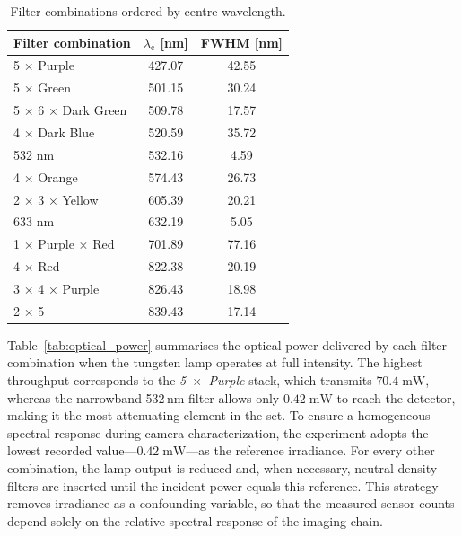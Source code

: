 \begin{table}[H]
    \centering
    \caption{Filter combinations ordered by centre wavelength.}
    \label{tab:cwl_fwhm_sorted}
    \begin{tabular}{|l|c|c|}
        \hline
        \rowcolor[HTML]{EFEFEF}
        \textbf{Filter combination} & \(\lambda_{\mathrm{c}}\) [nm] & FWHM [nm] \\ \hline
        5 × Purple                  & 427.07 & 42.55 \\ \hline
        5 × Green                   & 501.15 & 30.24 \\ \hline
        5 × 6 × Dark Green          & 509.78 & 17.57 \\ \hline
        4 × Dark Blue               & 520.59 & 35.72 \\ \hline
        532 nm                      & 532.16 & 4.59  \\ \hline
        4 × Orange                  & 574.43 & 26.73 \\ \hline
        2 × 3 × Yellow              & 605.39 & 20.21 \\ \hline
        633 nm                      & 632.19 & 5.05  \\ \hline
        1 × Purple × Red            & 701.89 & 77.16 \\ \hline
        4 × Red                     & 822.38 & 20.19 \\ \hline
        3 × 4 × Purple              & 826.43 & 18.98 \\ \hline
        2 × 5                       & 839.43 & 17.14 \\ \hline
    \end{tabular}
\end{table}

\noindent
Table~\ref{tab:optical_power} summarises the optical power delivered by each filter combination when the tungsten lamp operates at full intensity.  
The highest throughput corresponds to the \textit{5~$\times$~Purple} stack, which transmits \(70.4\;\mathrm{mW}\), whereas the narrowband 532\,nm filter allows only \(0.42\;\mathrm{mW}\) to reach the detector, making it the most attenuating element in the set. To ensure a homogeneous spectral response during camera characterization, the experiment adopts the lowest recorded value—\(0.42\;\mathrm{mW}\)—as the reference irradiance. For every other combination, the lamp output is reduced and, when necessary, neutral-density filters are inserted until the incident power equals this reference. This strategy removes irradiance as a confounding variable, so that the measured sensor counts depend solely on the relative spectral response of the imaging chain.\\

